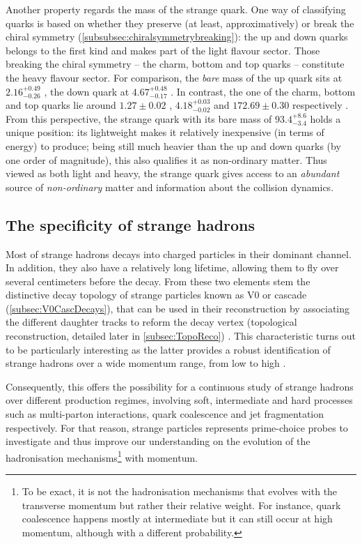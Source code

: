 Another property regards the mass of the strange quark. One way of classifying quarks is based on whether they preserve (at least, approximatively) or break the chiral symmetry (\Sec\ref{subsubsec:chiralsymmetrybreaking}): the up and down quarks belongs to the first kind and makes part of the light flavour sector. Those breaking the chiral symmetry -- the charm, bottom and top quarks -- constitute the heavy flavour sector. For comparison, the \emph{bare} mass of the up quark sits at $2.16_{-0.26}^{+0.49}$ \mmass, the down quark at $4.67_{-0.17}^{+0.48}$ \mmass. In contrast, the one of the charm, bottom and top quarks lie around $1.27 \pm 0.02$ \gmass, $4.18_{-0.02}^{+0.03}$ \gmass and $172.69 \pm 0.30$ \gmass respectively \cite{particledatagroupReviewParticlePhysics2022}. From this perspective, the strange quark with its bare mass of $93.4_{-3.4}^{+8.6}$ \mmass holds a unique position: its lightweight makes it relatively inexpensive (in terms of energy) to produce; being still much heavier than the up and down quarks (by one order of magnitude), this also qualifies it as non-ordinary matter. Thus viewed as both light and heavy, the strange quark gives access to an \emph{abundant} source of \emph{non-ordinary} matter and information about the collision dynamics.


\subsection{The specificity of strange hadrons}
\label{subsec:SpecStrangeHadrons}

Most of strange hadrons decays into charged particles in their dominant channel. In addition, they also have a relatively long lifetime, allowing them to fly over several centimeters before the decay. From these two elements stem the distinctive decay topology of strange particles known as V0 or cascade (\Sec\ref{subsec:V0CascDecays}), that can be used in their reconstruction by associating the different daughter tracks to reform the decay vertex (topological reconstruction, detailed later in \Sec\ref{subsec:TopoReco}) \cite{speltzCaracterisationEtatDense2006}. This characteristic turns out to be particularly interesting as the latter provides a robust identification of strange hadrons over a wide momentum range, from low to high \pT.

Consequently, this offers the possibility for a continuous study of strange hadrons over different production regimes, involving soft, intermediate and hard processes such as multi-parton interactions, quark coalescence and jet fragmentation respectively. For that reason, strange particles represents prime-choice probes to investigate and thus improve our understanding on the evolution of the hadronisation mechanisms\footnote{To be exact, it is not the hadronisation mechanisms that evolves with the transverse momentum but rather their relative weight. For instance, quark coalescence happens mostly at intermediate \pT but it can still occur at high momentum, although with a different probability.} with momentum.

